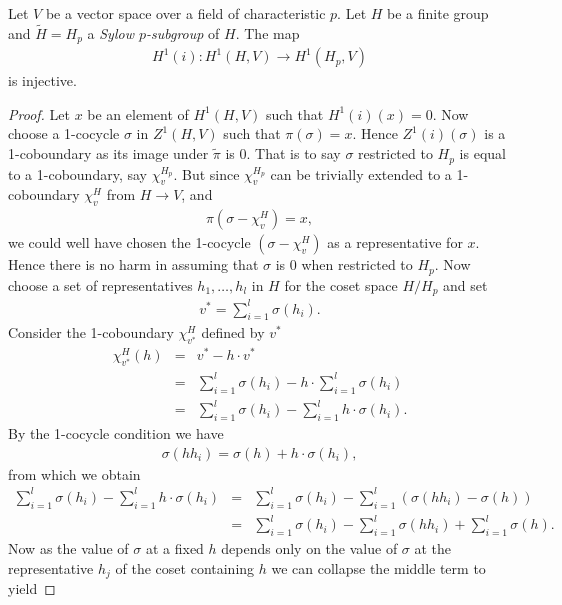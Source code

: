 \begin{lemma}\label{mapFromSylow}
Let $V$ be a vector space over a field of characteristic $p$. Let $H$ be a finite group and $\tilde{H} = H_p$ a \emph{Sylow $p$-subgroup} of $H$. The map 
\begin{eqnarray*}
H^1(i):H^1(H, V)\rightarrow H^1(H_p, V)
\end{eqnarray*}
is injective.
\end{lemma}
\begin{proof}
Let $x$ be an element of $H^1(H, V)$ such that $H^1(i)(x) = 0$. Now choose a 1-cocycle $\sigma$ in $Z^1(H, V)$ such that $\pi(\sigma) = x$. Hence $Z^1(i)(\sigma)$ is a 1-coboundary as its image under $\tilde\pi$ is 0. That is to say $\sigma$ restricted to $H_p$ is equal to a 1-coboundary, say $\chi_v^{H_p}$. But since $\chi_v^{H_p}$ can be trivially extended to a 1-coboundary $\chi_v^H$ from $H\rightarrow V$, and
\begin{eqnarray*}
	\pi(\sigma - \chi_v^H) = x,
\end{eqnarray*}
we could well have chosen the 1-cocycle $(\sigma - \chi_v^H)$ as a representative for $x$. Hence there is no harm in assuming that $\sigma$ is 0 when restricted to $H_p$.
Now choose a set of representatives $h_1, \ldots, h_l$ in $H$ for the coset space $H/H_p$ and set
\begin{eqnarray*}
	v^* = \sum_{i =1}^l \sigma(h_i).
\end{eqnarray*}
Consider the 1-coboundary $\chi_{v^*}^H$ defined by $v^*$
\begin{eqnarray*}
	\chi_{v^*}^H(h) &=& v^* - h\cdot v^* \\
	&=& \sum_{i = 1}^l\sigma(h_i) - h\cdot \sum_{i = 1}^l\sigma(h_i) \\
	&=& \sum_{i = 1}^l\sigma(h_i) - \sum_{i = 1}^l h\cdot \sigma(h_i).
\end{eqnarray*}
By the 1-cocycle condition we have
\begin{eqnarray*}
	\sigma(h h_i) = \sigma(h) + h\cdot\sigma(h_i),
\end{eqnarray*}
from which we obtain
\begin{eqnarray*}
	 \sum_{i = 1}^l\sigma(h_i) - \sum_{i = 1}^l h\cdot \sigma(h_i) &=& \sum_{i = 1}^l\sigma(h_i) - \sum_{i = 1}^l \left(\sigma(hh_i) - \sigma(h) \right)\\
	 &=& \sum_{i = 1}^l\sigma(h_i) - \sum_{i = 1}^l \sigma(hh_i) +\sum_{i = 1}^l \sigma(h).
\end{eqnarray*}
Now as the value of $\sigma$ at a fixed $h$ depends only on the value of $\sigma$ at the representative $h_j$ of the coset containing $h$ we can collapse the middle term to yield

\end{proof}
